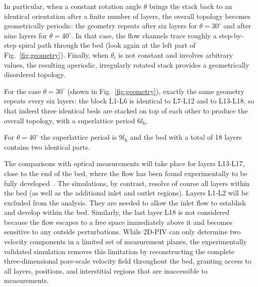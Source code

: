 In particular, when a constant rotation angle $\theta$ brings the stack back to an identical orientation after a finite number of layers, the overall topology becomes geometrically periodic: the geometry repeats after six layers for $\theta=30^\circ$ and after nine layers for $\theta=40^\circ$. In that case, the flow channels trace roughly a step-by-step spiral path through the bed (look again at the left part of Fig.~\ref{fig:geometry}). Finally, when $\theta_i$ is not constant and involves arbitrary values, the resulting aperiodic, irregularly rotated stack provides a geometrically disordered topology.

For the case $\theta=30^\circ$ (shown in Fig.~\ref{fig:geometry}), exactly the same geometry repeats every six layers: the block L1-L6 is identical to L7-L12 and to L13-L18, so that indeed three identical beds are stacked on top of each other to produce the overall topology, with a superlattice period $6 l_\mathrm{h}$.

For $\theta = 40^\circ$ the superlattice period is $9 l_\mathrm{h}$ and the bed with a total of 18 layers contains two identical parts.

The comparisons with optical measurements will take place for layers L13-L17, close to the end of the bed, where the flow has been found experimentally to be fully developed~\cite{velten2026}. The simulations, by contrast, resolve of course all layers within the bed (as well as the additional inlet and outlet regions). Layers L1-L2 will be excluded from the analysis. They are needed to allow the inlet flow to establish and develop within the bed. Similarly, the last layer L18 is not considered because the flow escapes to a free space immediately above it and becomes sensitive to any outside perturbations. While 2D-PIV can only determine two velocity components in a limited set of measurement planes, the experimentally validated simulation removes this limitation by reconstructing the complete three-dimensional pore-scale velocity field throughout the bed, granting access to all layers, positions, and interstitial regions that are inaccessible to measurements.



